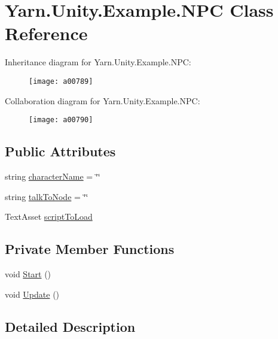 \hypertarget{a00131}{\section{Yarn.\-Unity.\-Example.\-N\-P\-C Class Reference}
\label{a00131}
}


Inheritance diagram for Yarn.\-Unity.\-Example.\-N\-P\-C\-:
\nopagebreak
\begin{figure}[H]
\begin{center}
\leavevmode
\texttt{[image: a00789]}
\end{center}
\end{figure}


Collaboration diagram for Yarn.\-Unity.\-Example.\-N\-P\-C\-:
\nopagebreak
\begin{figure}[H]
\begin{center}
\leavevmode
\texttt{[image: a00790]}
\end{center}
\end{figure}
\subsection*{Public Attributes}
\begin{DoxyCompactItemize}
\item 
string \hyperlink{a00131_a418ea7095bd8201559ed392f07905ca3}{character\-Name} = \char`\"{}\char`\"{}
\item 
string \hyperlink{a00131_a64f4f1fb66b2046a674e3ebf3b9fdb56}{talk\-To\-Node} = \char`\"{}\char`\"{}
\item 
Text\-Asset \hyperlink{a00131_a63145fb6ddf357e604d71bac04ca8a60}{script\-To\-Load}
\end{DoxyCompactItemize}
\subsection*{Private Member Functions}
\begin{DoxyCompactItemize}
\item 
void \hyperlink{a00131_a0bf37075312ea87c2e329cc363a328a6}{Start} ()
\item 
void \hyperlink{a00131_ab1bea5afabd1c2e1e991063b1579d062}{Update} ()
\end{DoxyCompactItemize}


\subsection{Detailed Description}



